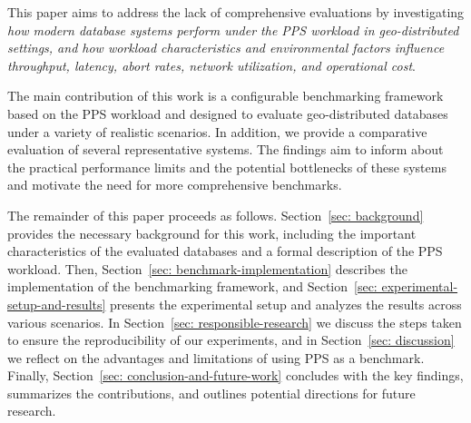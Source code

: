 This paper aims to address the lack of comprehensive evaluations by investigating \textit{how modern database systems perform under the PPS workload in geo-distributed settings, and how workload characteristics and environmental factors influence throughput, latency, abort rates, network utilization, and operational cost}.

The main contribution of this work is a configurable benchmarking framework based on the PPS workload and designed to evaluate geo-distributed databases under a variety of realistic scenarios. In addition, we provide a comparative evaluation of several representative systems. The findings aim to inform about the practical performance limits and the potential bottlenecks of these systems and motivate the need for more comprehensive benchmarks.

The remainder of this paper proceeds as follows. Section~\ref{sec: background} provides the necessary background for this work, including the important characteristics of the evaluated databases and a formal description of the PPS workload. Then, Section~\ref{sec: benchmark-implementation} describes the implementation of the benchmarking framework, and Section~\ref{sec: experimental-setup-and-results} presents the experimental setup and analyzes the results across various scenarios. In Section~\ref{sec: responsible-research} we discuss the steps taken to ensure the reproducibility of our experiments, and in Section~\ref{sec: discussion} we reflect on the advantages and limitations of using PPS as a benchmark. Finally, Section~\ref{sec: conclusion-and-future-work} concludes with the key findings, summarizes the contributions, and outlines potential directions for future research.
